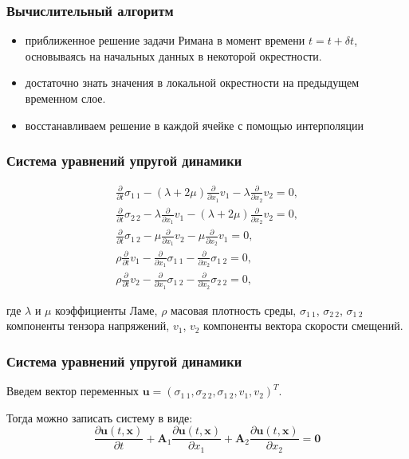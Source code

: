 \documentclass[unicode,aspectratio=43]{beamer}
\begin{document}
\begin{frame}\frametitle{Вычислительный алгоритм}
	\begin{itemize}
\item приближенное решение задачи Римана в момент времени $t = t + \delta t$, основываясь на начальных данных в некоторой окрестности. 

\item достаточно знать значения в локальной окрестности на предыдущем временном слое. 

\item восстанавливаем решение в каждой ячейке с помощью интерполяции
\end{itemize}
\end{frame}	

\begin{frame}\frametitle{Система уравнений упругой динамики}
	\begin{eqnarray*} \label{eq:1_2}
		\frac{\partial}{\partial t} \sigma_{1\:1} - (\lambda+2\mu) \frac{\partial}{\partial x_{1}} v_{1} - \lambda \frac{\partial}{\partial x_{2}} v_{2} = 0, \nonumber
		\\
		\frac{\partial}{\partial t} \sigma_{2\:2} - \lambda \frac{\partial}{\partial x_{1}} v_{1} - (\lambda+2\mu) \frac{\partial}{\partial x_{2}} v_{2} = 0, \nonumber
		\\
		\frac{\partial}{\partial t} \sigma_{1\:2} - \mu \frac{\partial}{\partial x_{1}} v_{2} - \mu \frac{\partial}{\partial x_{2}} v_{1} = 0, 
		\\
		\rho \frac{\partial}{\partial t} v_{1} - \frac{\partial}{\partial x_{1}} \sigma_{1\:1} - \frac{\partial}{\partial x_{2}} \sigma_{1\:2} = 0, \nonumber
		\\
		\rho \frac{\partial}{\partial t} v_{2} - \frac{\partial}{\partial x_{1}} \sigma_{1\:2} - \frac{\partial}{\partial x_{2}} \sigma_{2\:2} = 0, \nonumber
	\end{eqnarray*}
	
	где $ \lambda $ и $ \mu $ коэффициенты Ламе, $ \rho $ масовая плотность среды, $ \sigma_{1\:1} $, $ \sigma_{2\:2} $, $ \sigma_{1\:2} $ компоненты тензора напряжений, $ v_{1} $, $ v_{2} $ компоненты вектора скорости смещений.
\end{frame}

\begin{frame}\frametitle{Система уравнений упругой динамики}
	Введем вектор переменных $ \mathbf{u}=(\sigma_{1\:1}, \sigma_{2\:2}, \sigma_{1\:2}, v_{1}, v_{2})^{T} $.
	
	Тогда можно записать систему в виде:
	\begin{equation*} 
	\frac{{\partial {\mathbf{u}}\left( {t,{\mathbf{x}}} \right)}}{{\partial t}} +
	{{\mathbf{A}_1} \frac{{\partial {\mathbf{u}}\left( {t,{\mathbf{x}}}
				\right)}}{{\partial {x_1}}}}  + {{\mathbf{A}_2} \frac{{\partial {\mathbf{u}}\left( {t,{\mathbf{x}}}
				\right)}}{{\partial {x_2}}}} = {\mathbf{0}}
	\end{equation*}
\end{frame}
\end{document}
